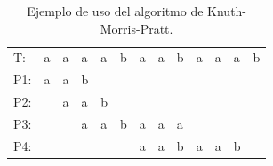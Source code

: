 \begin{table}[h]
\centering
\label{my-label6}
\begin{tabular}{lllllllllllll}
\cline{2-13}
\multicolumn{1}{l|}{T:} & \multicolumn{1}{l|}{a} & \multicolumn{1}{l|}{a} & \multicolumn{1}{l|}{a}                         & \multicolumn{1}{l|}{a}                         & \multicolumn{1}{l|}{b} & \multicolumn{1}{l|}{a}                         & \multicolumn{1}{l|}{a}                         & \multicolumn{1}{l|}{b}                         & \multicolumn{1}{l|}{a}                         & \multicolumn{1}{l|}{a}                         & \multicolumn{1}{l|}{a}                         & \multicolumn{1}{l|}{b} \\ \cline{2-13} 
\multicolumn{1}{l}{P1:}   & \multicolumn{1}{l}{a} & \multicolumn{1}{l}{a} & \multicolumn{1}{l}{\cellcolor[HTML]{FD6864}b} &                                                &                        &                                                &                                                &                                                &                                                &                                                &                                                &                        \\ 
P2:               & \multicolumn{1}{l}{}  & \multicolumn{1}{l}{a} & \multicolumn{1}{l}{a}                         & \multicolumn{1}{l}{\cellcolor[HTML]{FD6864}b} &                        &                                                &                                                &                                                &                                                &                                                &                                                &                        \\
  P3:                      &                        & \multicolumn{1}{l}{}  & \multicolumn{1}{l}{a}                         & \multicolumn{1}{l}{a}                         & \multicolumn{1}{l}{b} & \multicolumn{1}{l}{a}                         & \multicolumn{1}{l}{a}                         & \multicolumn{1}{l}{\cellcolor[HTML]{FD6864}a} &                                                &                                                &                                                &                        \\
 P4:                    &                        &                        &                                                &                                                & \multicolumn{1}{l}{}  & \multicolumn{1}{l}{\cellcolor[HTML]{9AFF99}a} & \multicolumn{1}{l}{\cellcolor[HTML]{9AFF99}a} & \multicolumn{1}{l}{\cellcolor[HTML]{9AFF99}b} & \multicolumn{1}{l}{\cellcolor[HTML]{9AFF99}a} & \multicolumn{1}{l}{\cellcolor[HTML]{9AFF99}a} & \multicolumn{1}{l}{\cellcolor[HTML]{9AFF99}b} &                        \\        
\end{tabular}
\caption{Ejemplo de uso del algoritmo de Knuth-Morris-Pratt.}
\end{table}

